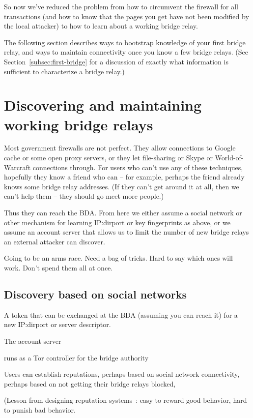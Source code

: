 \documentclass{llncs}
\begin{document}
So now we've reduced the problem from how to circumvent the firewall
for all transactions (and how to know that the pages you get have not
been modified by the local attacker) to how to learn about a working
bridge relay.

The following section describes ways to bootstrap knowledge of your first
bridge relay, and ways to maintain connectivity once you know a few
bridge relays. (See Section~\ref{subsec:first-bridge} for a discussion
of exactly what information is sufficient to characterize a bridge relay.)

\section{Discovering and maintaining working bridge relays}

Most government firewalls are not perfect. They allow connections to
Google cache or some open proxy servers, or they let file-sharing or
Skype or World-of-Warcraft connections through.
For users who can't use any of these techniques, hopefully they know
a friend who can -- for example, perhaps the friend already knows some
bridge relay addresses.
(If they can't get around it at all, then we can't help them -- they
should go meet more people.)

Thus they can reach the BDA. From here we either assume a social
network or other mechanism for learning IP:dirport or key fingerprints
as above, or we assume an account server that allows us to limit the
number of new bridge relays an external attacker can discover.

Going to be an arms race. Need a bag of tricks. Hard to say
which ones will work. Don't spend them all at once.

\subsection{Discovery based on social networks}

A token that can be exchanged at the BDA (assuming you
can reach it) for a new IP:dirport or server descriptor.

The account server

runs as a Tor controller for the bridge authority

Users can establish reputations, perhaps based on social network
connectivity, perhaps based on not getting their bridge relays blocked,

(Lesson from designing reputation systems~\cite{p2p-econ}: easy to
reward good behavior, hard to punish bad behavior.
\end{document}
